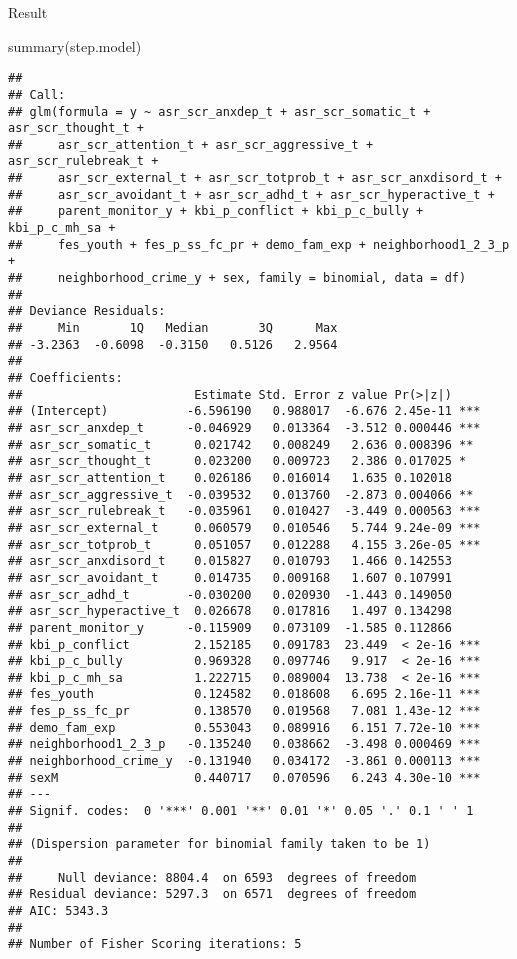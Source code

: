 \documentclass[
]{article}
\newenvironment{Shaded}{\begin{snugshade}}{\end{snugshade}}
\newcommand{\FunctionTok}[1]{\textcolor[rgb]{0.00,0.00,0.00}{#1}}
\newcommand{\NormalTok}[1]{#1}
\begin{document}
Result

\begin{Shaded}
\begin{Highlighting}[]
\FunctionTok{summary}\NormalTok{(step.model)}
\end{Highlighting}
\end{Shaded}

\begin{verbatim}
## 
## Call:
## glm(formula = y ~ asr_scr_anxdep_t + asr_scr_somatic_t + asr_scr_thought_t + 
##     asr_scr_attention_t + asr_scr_aggressive_t + asr_scr_rulebreak_t + 
##     asr_scr_external_t + asr_scr_totprob_t + asr_scr_anxdisord_t + 
##     asr_scr_avoidant_t + asr_scr_adhd_t + asr_scr_hyperactive_t + 
##     parent_monitor_y + kbi_p_conflict + kbi_p_c_bully + kbi_p_c_mh_sa + 
##     fes_youth + fes_p_ss_fc_pr + demo_fam_exp + neighborhood1_2_3_p + 
##     neighborhood_crime_y + sex, family = binomial, data = df)
## 
## Deviance Residuals: 
##     Min       1Q   Median       3Q      Max  
## -3.2363  -0.6098  -0.3150   0.5126   2.9564  
## 
## Coefficients:
##                        Estimate Std. Error z value Pr(>|z|)    
## (Intercept)           -6.596190   0.988017  -6.676 2.45e-11 ***
## asr_scr_anxdep_t      -0.046929   0.013364  -3.512 0.000446 ***
## asr_scr_somatic_t      0.021742   0.008249   2.636 0.008396 ** 
## asr_scr_thought_t      0.023200   0.009723   2.386 0.017025 *  
## asr_scr_attention_t    0.026186   0.016014   1.635 0.102018    
## asr_scr_aggressive_t  -0.039532   0.013760  -2.873 0.004066 ** 
## asr_scr_rulebreak_t   -0.035961   0.010427  -3.449 0.000563 ***
## asr_scr_external_t     0.060579   0.010546   5.744 9.24e-09 ***
## asr_scr_totprob_t      0.051057   0.012288   4.155 3.26e-05 ***
## asr_scr_anxdisord_t    0.015827   0.010793   1.466 0.142553    
## asr_scr_avoidant_t     0.014735   0.009168   1.607 0.107991    
## asr_scr_adhd_t        -0.030200   0.020930  -1.443 0.149050    
## asr_scr_hyperactive_t  0.026678   0.017816   1.497 0.134298    
## parent_monitor_y      -0.115909   0.073109  -1.585 0.112866    
## kbi_p_conflict         2.152185   0.091783  23.449  < 2e-16 ***
## kbi_p_c_bully          0.969328   0.097746   9.917  < 2e-16 ***
## kbi_p_c_mh_sa          1.222715   0.089004  13.738  < 2e-16 ***
## fes_youth              0.124582   0.018608   6.695 2.16e-11 ***
## fes_p_ss_fc_pr         0.138570   0.019568   7.081 1.43e-12 ***
## demo_fam_exp           0.553043   0.089916   6.151 7.72e-10 ***
## neighborhood1_2_3_p   -0.135240   0.038662  -3.498 0.000469 ***
## neighborhood_crime_y  -0.131940   0.034172  -3.861 0.000113 ***
## sexM                   0.440717   0.070596   6.243 4.30e-10 ***
## ---
## Signif. codes:  0 '***' 0.001 '**' 0.01 '*' 0.05 '.' 0.1 ' ' 1
## 
## (Dispersion parameter for binomial family taken to be 1)
## 
##     Null deviance: 8804.4  on 6593  degrees of freedom
## Residual deviance: 5297.3  on 6571  degrees of freedom
## AIC: 5343.3
## 
## Number of Fisher Scoring iterations: 5
\end{verbatim}
\end{document}
